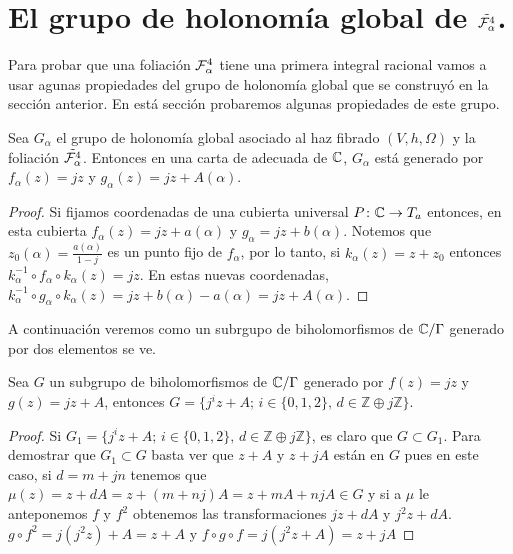 \section{El grupo de holonomía global de $\tilde{\mathcal{F}_{\alpha}^{4}}$.}

Para probar que una foliación $\mathcal{F}_{\alpha}^{4}$ tiene una primera integral racional vamos a usar agunas propiedades del grupo de holonomía global que se construyó en la sección anterior. En está sección probaremos algunas propiedades de este grupo. 

\begin{Lema}
\label{Prop:GrupoHolonomia}
Sea $G_{\alpha}$ el grupo de holonomía global asociado al haz fibrado $(V,h,\Omega)$ y la foliación $\tilde{\mathcal{F}_{\alpha}^{4}}$. Entonces en una carta de adecuada de $\mathbb{C}$, $G_{\alpha}$ está generado por $f_{\alpha}(z)=jz$ y $g_{\alpha}(z)=jz+A(\alpha)$.
\end{Lema}
\begin{proof}
Si fijamos coordenadas de una cubierta universal $P\colon \mathbb{C}\rightarrow T_{a}$ entonces, en esta cubierta $f_{\alpha}(z)=jz+a(\alpha)$ y $g_{\alpha}=jz+b(\alpha)$. Notemos que $z_{0}(\alpha)=\tfrac{a(\alpha)}{1-j}$ es un punto fijo de $f_{\alpha}$, por lo tanto, si $k_{\alpha}(z)=z+z_{0}$ entonces $k_{\alpha}^{-1}\circ f_{\alpha}\circ k_{\alpha}(z)=jz$. En estas nuevas coordenadas, $k_{\alpha}^{-1}\circ g_{\alpha}\circ k_{\alpha}(z)=jz+b(\alpha)-a(\alpha)=jz+A(\alpha)$. 
\end{proof}

A continuación veremos como un subrgupo de biholomorfismos de $\mathbb{C}/\Gamma$ generado por dos elementos se ve.

\begin{Proposicion}
\label{Prop:DescripcionDelGrupo}
Sea $G$ un subgrupo de biholomorfismos de $\mathbb{C}/\Gamma$ generado por $f(z)=jz$ y $g(z)=jz+A$, entonces $G=\{j^{i}z+A;\, i\in\{0,1,2\},\, d\in\mathbb{Z}\oplus j\mathbb{Z} \}$.
\end{Proposicion}
\begin{proof}
Si $G_{1}=\{j^{i}z+A;\, i\in\{0,1,2\},\, d\in\mathbb{Z}\oplus j\mathbb{Z} \}$, es claro que $G\subset G_{1}$. Para demostrar que $G_{1}\subset G$ basta ver que $z+A$ y $z+jA$ están en $G$ pues en este caso, si $d=m+jn$ tenemos que $\mu(z)=z+dA=z+(m+nj)A=z+mA+njA\in G$ y si a $\mu$ le anteponemos $f$ y $f^{2}$ obtenemos las transformaciones $jz+dA$ y $j^{2}z+dA$. $g\circ f^{2}=j(j^{2}z)+A=z+A$ y $f\circ g\circ f=j(j^{2}z+A)=z+jA$
\end{proof}

